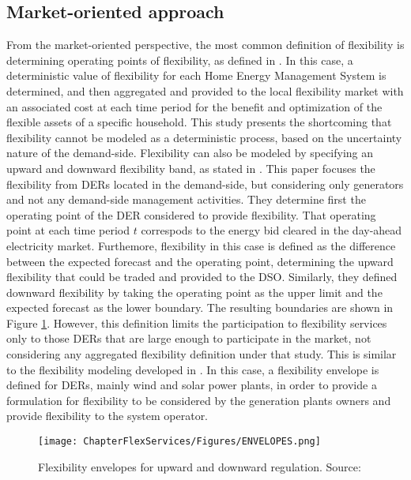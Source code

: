 \subsection{Market-oriented approach}
From the market-oriented perspective, the most common definition of flexibility is determining operating points of flexibility, as defined in \cite{Olivella-Rosell2018}. In this case, a deterministic value of flexibility for each Home Energy Management System is determined, and then aggregated and provided to the local flexibility market with an associated cost at each time period for the benefit and optimization of the flexible assets of a specific household. This study presents the shortcoming that flexibility cannot be modeled as a deterministic process, based on the uncertainty nature of the demand-side. Flexibility can also be modeled by specifying an upward and downward flexibility band, as stated in \cite{Soares2017}. This paper focuses the flexibility from DERs located in the demand-side, but considering only generators and not any demand-side management activities. They determine first the operating point of the DER considered to provide flexibility. That operating point at each time period $t$ correspods to the energy bid cleared in the day-ahead electricity market. Furthemore, flexibility in this case is defined as the difference between the expected forecast and the operating point, determining the upward flexibility that could be traded and provided to the DSO. Similarly, they defined downward flexibility by taking the operating point as the upper limit and the expected forecast as the lower boundary. The resulting boundaries are shown in Figure \ref{fig:envelopes}. However, this definition limits the participation to flexibility services only to those DERs that are large enough to participate in the market, not considering any aggregated flexibility definition under that study. This is similar to the flexibility modeling developed in \cite{Nosair2015}. In this case, a flexibility envelope is defined for DERs, mainly wind and solar power plants, in order to provide a formulation for flexibility to be considered by the generation plants owners and provide flexibility to the system operator. 

\begin{figure}[htbp]
	\centering
	\texttt{[image: ChapterFlexServices/Figures/ENVELOPES.png]}
		\caption{Flexibility envelopes for upward and downward regulation. Source: \cite{Soares2017}}
	\label{fig:envelopes}  
\end{figure}



